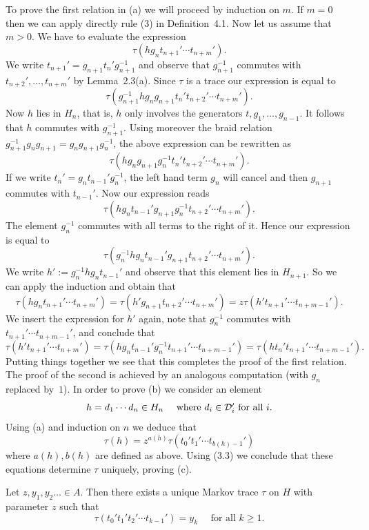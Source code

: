 \begin{pf} To prove the first relation in (a) we will proceed by induction 
on $m$.    If $m=0$   then we    can   apply directly    rule (3)   in
Definition~4.1.  Now let  us assume that  $m>0$.  We  have to evaluate
the expression
\[\tau(hg_nt_{n+1}' \cdots t_{n+m}').\]
We write $t_{n+1}'=g_{n+1}t_n'g_{n+1}^{-1}$ and observe that $g_{n+1}^{-1}$
commutes with $t_{n+2}',\ldots,t_{n+m}'$ by Lemma~2.3(a). Since $\tau$ is
a trace our expression is equal to
\[\tau(g_{n+1}^{-1}hg_ng_{n+1}t_n't_{n+2}' \cdots t_{n+m}').\]
Now $h$   lies in $H_n$,  that is,  $h$ only   involves the generators
$t,g_1,\ldots,g_{n-1}$.     It follows    that    $h$   commutes  with
$g_{n+1}^{-1}$.    Using      moreover        the   braid     relation
$g_{n+1}^{-1}g_ng_{n+1}=g_ng_{n+1}g_n^{-1}$, the above  expression can
be rewritten as
\[\tau(hg_ng_{n+1}g_n^{-1}t_n't_{n+2}' \cdots t_{n+m}').\] 
If we write $t_n'=g_nt_{n-1}'g_n^{-1}$,  the left hand term $g_n$ will
cancel and then $g_{n+1}$ commutes with $t_{n-1}'$. Now our expression
reads
\[\tau(hg_nt_{n-1}'g_{n+1}g_n^{-1}t_{n+2}' \cdots t_{n+m}').\] 
The element $g_n^{-1}$ commutes with all terms to the right of it. Hence our
expression is equal to
\[\tau(g_n^{-1}hg_nt_{n-1}'g_{n+1}t_{n+2}' \cdots t_{n+m}').\]
We write $h':=g_n^{-1}hg_nt_{n-1}'$ and observe that this element lies
in $H_{n+1}$. So we can apply the induction and obtain that
\[\tau(hg_nt_{n+1}' \cdots t_{n+m}')=\tau(h'g_{n+1}t_{n+2}' \cdots t_{n+m}')=
z \tau(h't_{n+1}' \cdots t_{n+m-1}').\]
We insert the expression for $h'$ again, note that $g_n^{-1}$ commutes
with $t_{n+1}' \cdots t_{n+m-1}'$, and conclude that
\[\tau(h't_{n+1}' \cdots t_{n+m}')= 
\tau(hg_nt_{n-1}'g_n^{-1} t_{n+1}' \cdots t_{n+m-1}')=
\tau(ht_n't_{n+1}' \cdots t_{n+m-1}').\]
Putting  things together we see that  this completes  the proof of the
first relation. The proof  of the second is  achieved by  an analogous
computation  (with $g_n$ replaced by~$1$).  In  order  to prove (b) we
consider an element
\[ h=d_1 \cdots d_n \in H_n \quad \mbox{ where $d_i \in {\cal D}_i'$ for all
$i$.} \] Using (a) and induction on $n$ we deduce that 
\[ \tau(h)=z^{a(h)} \tau(t_0't_1' \cdots t_{b(h)-1}')\]
where $a(h),b(h)$ are defined as above. Using (3.3) we 
conclude that these equations determine $\tau$ uniquely, proving (c).  
\end{pf}

\begin{thm}
Let $z,y_1,y_2 \ldots \in A$. Then there exists a unique Markov trace 
$\tau$ on $H$ with parameter $z$ such that 
\[ \tau(t_0't_1't_2' \cdots t_{k-1}')=y_k \quad \mbox{ for all $k \geq 1$.}\]
\end{thm}

